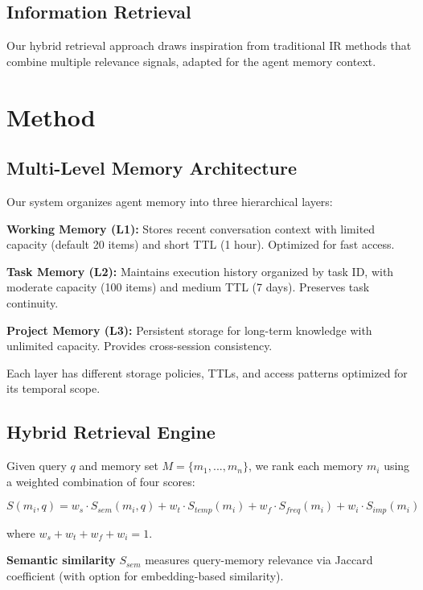 \documentclass{article}
\begin{document}
\subsection{Information Retrieval}

Our hybrid retrieval approach draws inspiration from traditional IR methods that
combine multiple relevance signals, adapted for the agent memory context.

\section{Method}

\subsection{Multi-Level Memory Architecture}

Our system organizes agent memory into three hierarchical layers:

\textbf{Working Memory (L1):} Stores recent conversation context with limited
capacity (default 20 items) and short TTL (1 hour). Optimized for fast access.

\textbf{Task Memory (L2):} Maintains execution history organized by task ID,
with moderate capacity (100 items) and medium TTL (7 days). Preserves task
continuity.

\textbf{Project Memory (L3):} Persistent storage for long-term knowledge with
unlimited capacity. Provides cross-session consistency.

Each layer has different storage policies, TTLs, and access patterns optimized
for its temporal scope.

\subsection{Hybrid Retrieval Engine}

Given query $q$ and memory set $M = \{m_1, ..., m_n\}$, we rank each memory $m_i$
using a weighted combination of four scores:

\begin{equation}
S(m_i, q) = w_s \cdot S_{sem}(m_i, q) + w_t \cdot S_{temp}(m_i) + w_f \cdot S_{freq}(m_i) + w_i \cdot S_{imp}(m_i)
\end{equation}

where $w_s + w_t + w_f + w_i = 1$.

\textbf{Semantic similarity} $S_{sem}$ measures query-memory relevance via Jaccard
coefficient (with option for embedding-based similarity).
\end{document}
